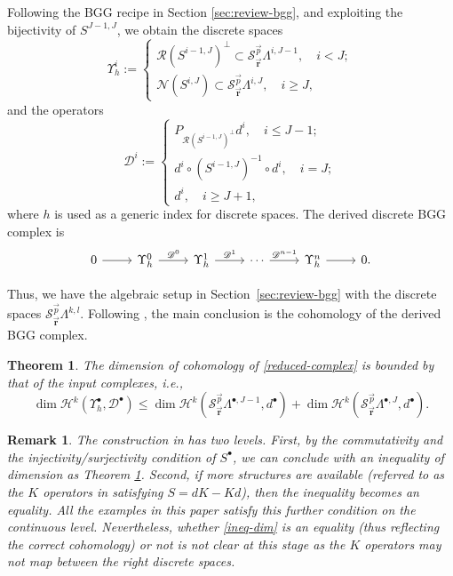 \documentclass[final]{amsart}%
\newtheorem{theorem}{Theorem}
\newtheorem{remark}{Remark}
\newcommand{\0}{\mathaccent23}
\renewcommand\ker{\mathcal{N}}
\newcommand\ran{\mathcal{R}}
\newcommand{\bs}{{\scriptscriptstyle \bullet}}
\newcommand{\vbr}{\vec{\mathbf r}}
\newcommand{\vp}{\vec{p}}
\begin{document}
Following the BGG recipe in Section \ref{sec:review-bgg}, and exploiting the bijectivity of $S^{J-1,J}$, we obtain the discrete spaces
$$
\Upsilon_{h}^{i}:=
\begin{cases}
 \ran(S^{i-1, J})^{\perp}\subset \mathscr{S}_{\vbr}^{\vp}\Lambda^{i, J-1}, \quad i<J;\\
 \ker(S^{i, J})\subset \mathscr{S}_{\vbr}^{\vp}\Lambda^{i, J}, \quad i\geq J, 
\end{cases}
$$
and the operators
$$
\mathscr D^{i}:=
\begin{cases}
 P_{\ran(S^{i-1, J})^{\perp}}d^{i}, \quad i\leq J-1;\\
 d^{i}\circ (S^{i-1, J})^{-1}\circ d^{i}, \quad i=J;\\
d^{i}, \quad i\geq J+1,
\end{cases}
$$
where $h$ is used as a generic index for discrete spaces. The derived discrete BGG complex is 
\begin{equation}\label{reduced-complex}
\begin{tikzcd}
0 \arrow{r}&\Upsilon^{0}_h\arrow{r}{\mathscr{D}^{0}} &\Upsilon^{1}_h \arrow{r}{\mathscr{D}^{1}} &\cdots \arrow{r}{\mathscr{D}^{n-1}} &\Upsilon^{n}_h\arrow{r}& 0.
 \end{tikzcd}
\end{equation}

Thus, we have the algebraic setup in Section~\ref{sec:review-bgg} with the discrete spaces $\mathscr{S}_{\vbr}^{\vp}\Lambda^{k, l}$. 
Following \cite[Theorem 6]{arnold2021complexes}, the main conclusion is the cohomology of the derived BGG complex.

\begin{theorem}\label{thm:ineq-dim}
The dimension of cohomology of \eqref{reduced-complex} is bounded by that of the input complexes, i.e.,
\begin{equation}\label{ineq-dim}
\dim \mathscr{H}^k(\Upsilon^\bs_h, \mathscr{D}^\bs)\leq \dim \mathscr{H}^k(\mathscr{S}_{\vbr}^{\vp}\Lambda^{\bs, J-1}, {d}^\bs)+\dim \mathscr{H}^k(\mathscr{S}_{\vbr}^{\vp}\Lambda^{\bs, J}, {d}^\bs).
\end{equation}
\end{theorem}

\begin{remark}
The construction in \cite{arnold2021complexes} has two levels. First, by the commutativity and the injectivity/surjectivity condition of $S^\bs$, we can conclude with an inequality of dimension as Theorem \ref{thm:ineq-dim}. Second, if more structures are available (referred to as the $K$ operators in \cite{arnold2021complexes} satisfying $S=dK-Kd$), then the inequality becomes an equality. All the examples in this paper satisfy this further condition on the continuous level. Nevertheless, whether \eqref{ineq-dim} is an equality (thus reflecting the correct cohomology) or not is not clear at this stage as the $K$ operators may not map between the right discrete spaces.
\end{remark}
\end{document}
